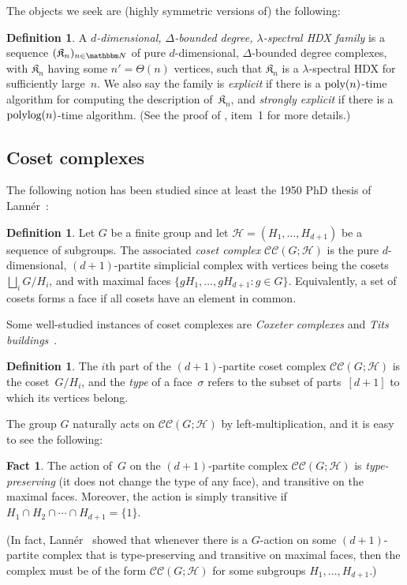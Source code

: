 \documentclass[10pt,a4paper]{article}
\theoremstyle{definition}
\newtheorem{definition}[theorem]{Definition}
\newtheorem{fact}[theorem]{Fact}
\newcommand{\poly}{\textnormal{poly}}
\newcommand{\polylog}{\textnormal{polylog}}
\newcommand{\N}{\mathbbm N}
\newcommand{\calH}{\mathcal{H}}
\newcommand{\CC}[2]{\mathcal{C}\mathcal{C}(#1;#2)}
\newcommand{\complex}{\mathfrak{K}}
\begin{document}
The objects we seek are (highly symmetric versions of) the following:
\begin{definition}
    A \emph{$d$-dimensional, $\Delta$-bounded degree, $\lambda$-spectral HDX family} is a sequence $(\complex_n)_{n \in \N}$ of pure $d$-dimensional, $\Delta$-bounded degree complexes, with $\complex_n$ having some $n' = \Theta(n)$ vertices, such that $\complex_n$ is a $\lambda$-spectral HDX for sufficiently large~$n$.
    We also say the family is \emph{explicit} if there is a $\poly(n)$-time algorithm for computing the description of~$\complex_n$, and \emph{strongly explicit} if there is a $\polylog(n)$-time algorithm.  (See the proof of , item~1 for more details.)
\end{definition}

\subsection{Coset complexes}
The following notion has been studied since at least the 1950 PhD thesis of Lann\'{e}r~\cite{Lan50}:
\begin{definition}
    Let $G$ be a finite group and let $\calH = (H_1, \dots, H_{d+1})$ be a sequence of subgroups.
    The associated \emph{coset complex} $\CC{G}{\calH}$ is the pure $d$-dimensional, $(d+1)$-partite simplicial complex with vertices being the cosets $\bigsqcup_i G/H_i$, and with maximal faces $\{gH_1, \dots, gH_{d+1} : g \in G\}$.
    Equivalently, a set of cosets forms a face if all cosets have an element in common.
\end{definition}
Some well-studied instances of coset complexes are \emph{Coxeter complexes} and \emph{Tits buildings}~\cite{Bjo84}.
\begin{definition}                                        \label{fact:types}
    The $i$th part of the $(d+1)$-partite coset complex $\CC{G}{\calH}$ is the coset~$G/H_i$, and the \emph{type} of a face~$\sigma$ refers to the subset of parts~$[d+1]$ to which its vertices belong.
\end{definition}
The group $G$ naturally acts on $\CC{G}{\calH}$ by left-multiplication, and it is easy to see the following:
\begin{fact}                                        \label{fact:type-preserving}
    The action of~$G$ on the $(d+1)$-partite complex $\CC{G}{\calH}$ is \emph{type-preserving} (it does not change the type of any face), and transitive on the maximal faces.
    Moreover, the action is simply transitive if $H_1 \cap H_2 \cap \cdots \cap H_{d+1} = \{1\}$.
\end{fact}
\noindent (In fact, Lann\'{e}r~\cite{Lan50} showed that whenever there is a $G$-action on some $(d+1)$-partite complex that is type-preserving and transitive on maximal faces, then the complex must be of the form $\CC{G}{\calH}$ for some subgroups $H_1, \dots, H_{d+1}$.)
\end{document}

